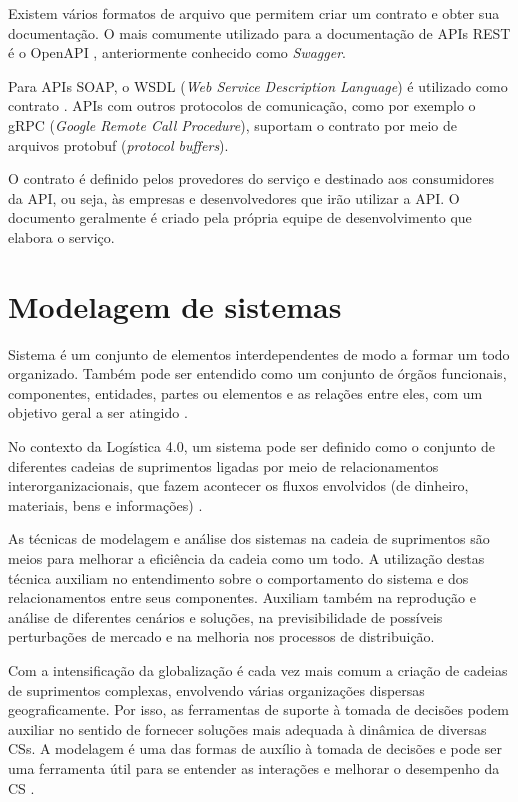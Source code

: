 Existem vários formatos de arquivo que permitem criar um contrato e obter sua documentação. O mais comumente utilizado para a documentação de APIs REST é o OpenAPI \cite{santos2020openapi}, anteriormente conhecido como \textit{Swagger}.

Para APIs SOAP, o WSDL (\textit{Web Service Description Language}) é utilizado como contrato \cite{ferris2003wsdl}. APIs com outros protocolos de comunicação, como por exemplo o gRPC (\textit{Google Remote Call Procedure}), suportam o contrato por meio de arquivos protobuf (\textit{protocol buffers}).

O contrato é definido pelos provedores do serviço e destinado aos consumidores da API, ou seja, às empresas e desenvolvedores que irão utilizar a API. O documento geralmente é criado pela própria equipe de desenvolvimento que elabora o serviço.

\section{Modelagem de sistemas}
\label{sec:modelagem}

Sistema é um conjunto de elementos interdependentes de modo a formar um todo organizado. Também pode ser entendido como um conjunto de órgãos funcionais, componentes, entidades, partes ou elementos e as relações entre eles, com um objetivo geral a ser atingido \cite{mulbert2005sistemas}.

No contexto da Logística 4.0, um sistema pode ser definido como o conjunto de diferentes cadeias de suprimentos ligadas por meio de relacionamentos interorganizacionais, que fazem acontecer os fluxos envolvidos (de dinheiro, materiais, bens e informações) \cite{oliveira2016supplychain}.

As técnicas de modelagem e análise dos sistemas na cadeia de suprimentos são meios para melhorar a eficiência da cadeia como um todo. A utilização destas técnica auxiliam no entendimento sobre o comportamento do sistema e dos relacionamentos entre seus componentes. Auxiliam também na reprodução e análise de diferentes cenários e soluções, na previsibilidade de possíveis perturbações de mercado e na melhoria nos processos de distribuição.

Com a intensificação da globalização é cada vez mais comum a criação de cadeias de suprimentos complexas, envolvendo várias organizações dispersas geograficamente. Por isso, as ferramentas de suporte à tomada de decisões podem auxiliar no sentido de fornecer soluções mais adequada à dinâmica de diversas CSs. A modelagem é uma das formas de auxílio à tomada de decisões e pode ser uma ferramenta útil para se entender as interações e melhorar o desempenho da CS \cite{oliveira2016supplychain}.

